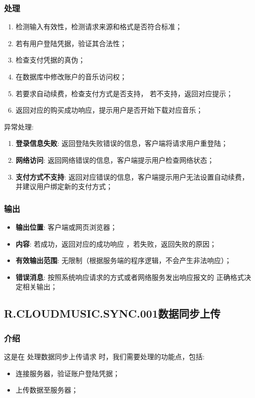 \begin{enumerate}
{\subsubsection{处理}
	\begin{enumerate}
		\item 检测输入有效性，检测请求来源和格式是否符合标准；
		\item 若有用户登陆凭据，验证其合法性；
		\item 检查支付凭据的真伪；
		\item 在数据库中修改账户的音乐访问权；
		\item 若要求自动续费，检查支付方式是否支持，
			若不支持，返回对应提示；
		\item 返回对应的购买成功响应，提示用户是否开始下载对应音乐；
	\end{enumerate}
	\noindent 异常处理: 
	\begin{enumerate}
		\item \textbf{登录信息失败}: 返回登陆失败错误的信息，客户端将请求用户重登陆；
		\item \textbf{网络访问}: 返回网络错误的信息，客户端提示用户检查网络状态；
		\item \textbf{支付方式不支持}: 返回对应错误的信息，客户端提示用户无法设置自动续费，
			并建议用户绑定新的支付方式；
	\end{enumerate}
\subsubsection{输出}
\begin{itemize}
	\item \textbf{输出位置}: 客户端或网页浏览器；
	\item \textbf{内容}: 若成功，返回对应的成功响应 ，若失败，返回失败的原因；
	\item \textbf{有效输出范围}: 无限制（根据服务端的程序逻辑，不会产生非法响应）；
	\item \textbf{错误消息}: 按照系统响应请求的方式或者网络服务发出响应报文的
		正确格式决定相关输出；
\end{itemize}
}

\subsection{R.CLOUDMUSIC.SYNC.001数据同步上传}
\subsubsection{介绍}
	这是在 处理数据同步上传请求 时，我们需要处理的功能点，包括: 
	\begin{itemize}
		\item 连接服务器，验证账户登陆凭据；
		\item 上传数据至服务器；
	\end{itemize}

\end{enumerate}
